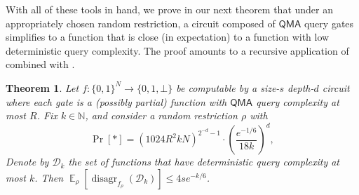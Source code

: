 \documentclass[11pt]{article}%
\newtheorem{theorem}{Theorem}
\newcommand{\E}{\mathop{\mathbb{E}}}
\newcommand{\Naturals}{\mathbb{N}}
\DeclareMathOperator{\disagr}{\mathrm{disagr}}
\begin{document}
With all of these tools in hand, we prove in our next theorem that under an appropriately chosen random restriction, a circuit composed of $\mathsf{QMA}$ query gates simplifies to a function that is close (in expectation) to a function with low deterministic query complexity. The proof amounts to a recursive application of  combined with .

\begin{theorem}
\label{thm:qmah_random_restriction}
Let $f: \{0,1\}^N \to \{0,1,\bot\}$ be computable by a size-$s$ depth-$d$ circuit where each gate is a (possibly partial) function with $\mathsf{QMA}$ query complexity at most $R$. Fix $k \in \Naturals$, and consider a random restriction $\rho$ with
\[
\Pr[*] = \left(1024R^2 k N\right)^{2^{-d} - 1} \cdot \left(\frac{e^{-1/6}}{18k}\right)^d,
\]
Denote by $\mathcal{D}_k$ the set of functions that have deterministic query complexity at most $k$. Then $\E_\rho\left[\disagr_{f_\rho}\left(\mathcal{D}_k\right)\right] \le 4se^{-k/6}$.
\end{theorem}
\end{document}
